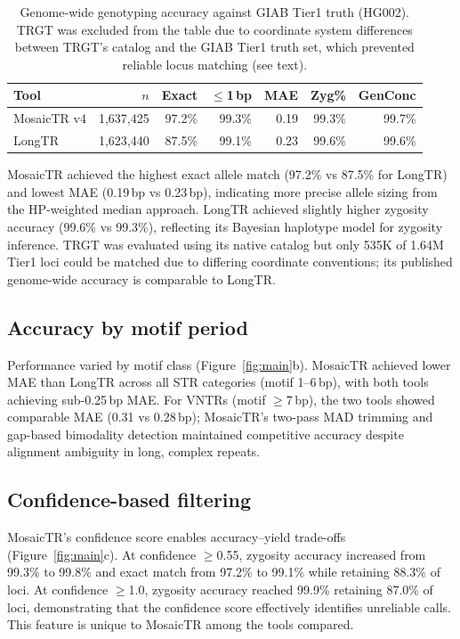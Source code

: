 \documentclass[12pt]{article}
\begin{document}
\begin{table}[h]
\centering
\caption{Genome-wide genotyping accuracy against GIAB Tier1 truth (HG002).
TRGT was excluded from the table due to coordinate system differences between TRGT's catalog and the GIAB Tier1 truth set, which prevented reliable locus matching (see text).}
\label{tab:overall}
\begin{tabular}{lrrrrrr}
\toprule
Tool & $n$ & Exact & $\leq$1\,bp & MAE & Zyg\% & GenConc \\
\midrule
MosaicTR v4 & 1,637,425 & 97.2\% & 99.3\% & 0.19 & 99.3\% & 99.7\% \\
LongTR     & 1,623,440 & 87.5\% & 99.1\% & 0.23 & 99.6\% & 99.6\% \\
\bottomrule
\end{tabular}
\end{table}

MosaicTR achieved the highest exact allele match (97.2\% vs 87.5\% for LongTR) and lowest MAE (0.19\,bp vs 0.23\,bp), indicating more precise allele sizing from the HP-weighted median approach.
LongTR achieved slightly higher zygosity accuracy (99.6\% vs 99.3\%), reflecting its Bayesian haplotype model for zygosity inference.
TRGT \citep{dolzhenko2024} was evaluated using its native catalog but only 535K of 1.64M Tier1 loci could be matched due to differing coordinate conventions; its published genome-wide accuracy is comparable to LongTR.

\subsection*{Accuracy by motif period}

Performance varied by motif class (Figure~\ref{fig:main}b).
MosaicTR achieved lower MAE than LongTR across all STR categories (motif 1--6\,bp), with both tools achieving sub-0.25\,bp MAE.
For VNTRs (motif $\geq$7\,bp), the two tools showed comparable MAE (0.31 vs 0.28\,bp); MosaicTR's two-pass MAD trimming and gap-based bimodality detection maintained competitive accuracy despite alignment ambiguity in long, complex repeats.

\subsection*{Confidence-based filtering}

MosaicTR's confidence score enables accuracy--yield trade-offs (Figure~\ref{fig:main}c).
At confidence $\geq$0.55, zygosity accuracy increased from 99.3\% to 99.8\% and exact match from 97.2\% to 99.1\% while retaining 88.3\% of loci.
At confidence $\geq$1.0, zygosity accuracy reached 99.9\% retaining 87.0\% of loci, demonstrating that the confidence score effectively identifies unreliable calls.
This feature is unique to MosaicTR among the tools compared.
\end{document}
